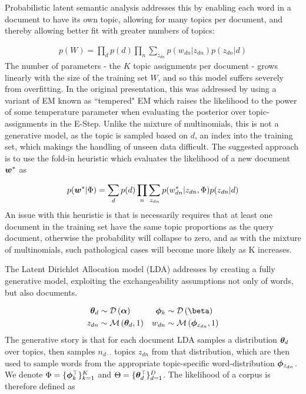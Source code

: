 Probabilistic latent semantic analysis\cite{Hofmann1999a} addresses this by enabling each word in a document to have its own topic, allowing for many topics per document, and thereby allowing better fit with greater numbers of topics:

\begin{align}
p(W) = \prod_d p(d) \prod_n \sum_{z_{dn}} p(w_{dn}|z_{dn})p(z_{dn}|d)
\end{align}
The number of parameters - the $K$ topic assignments per document - grows linearly with the size of the training set $W$, and so this model suffers severely from overfitting. In the original presentation, this was addressed by using a variant of EM known as ``tempered" EM which raises the likelihood to the power of some temperature parameter when evaluating the posterior over topic-assignments in the E-Step. Unlike the mixture of multinomials, this is not a generative model, as the topic is sampled based on $d$, an index into the training set, which makings the handling of unseen data difficult. The suggested approach is to use the fold-in heuristic which evaluates the likelihood of a new document $\bm w^*$ as

\begin{align}
p(\bm w^*|\Phi) = \sum_d p(d) \prod_n \sum_{z_{dn}} p(w_{dn}^*|z_{dn}, \Phi) p(z_{dn}|d)
\end{align}
An issue with this heuristic is that is necessarily requires that at least one document in the training set have the same topic proportions as the query document, otherwise the probability will collapse to zero, and as with the mixture of multinomials, such pathological cases will become more likely as K increases.

The Latent Dirichlet Allocation model\cite{BleiNgJordan2003} (LDA) addresses by creating a fully generative model, exploiting the exchangeability assumptions not only of words, but also documents.

\begin{align}
\thd & \sim \dir{\vv{\alpha}} & \pk & \sim \dir{\vv{\beta}} \\
z_{dn} & \sim \muln{\thd}{1} & w_{dn} & \sim \muln{\vv{\phi}_{z_{dn}}}{1}
\end{align}
The generative story is that for each document LDA samples a distribution ${ \bm \theta_d }$ over topics, then samples $n_{d\cdot\cdot}$ topics $z_{dn}$ from that distribution, which are then used to sample words from the appropriate topic-specific word-distribution $\bm \phi_{z_{dn}}$. We denote $\Phi = \{ \bm \phi_k^\top \}_{k=1}^K$ and $\Theta = \{ \bm \theta_d^\top \}_{d=1}^D$. The likelihood of a corpus is therefore defined as

